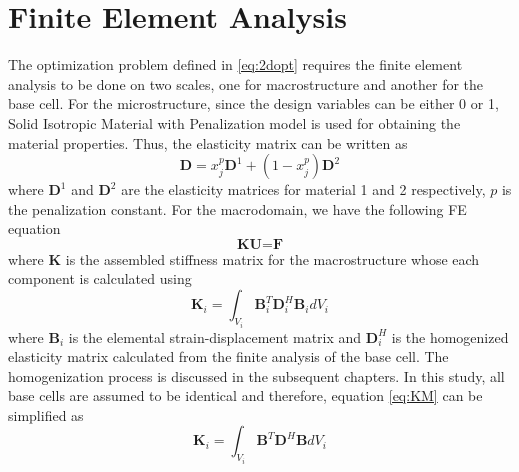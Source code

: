 \documentclass[openright,twoside]{iitkthesis}
\begin{document}
\section{Finite Element Analysis} 
The optimization problem defined in \eqref{eq:2dopt} requires the finite element analysis to be done on two scales, one for macrostructure and another for the base cell. For the microstructure, since the design variables can be either 0 or 1, Solid Isotropic Material with Penalization model\cite{paper:simp} is used for obtaining the material properties. Thus, the elasticity matrix can be written as
\begin{equation}
\label{eq:simp}
\textbf{D} = x_j^p\textbf{D}^1 + (1-x_j^p)\textbf{D}^2
\end{equation}
where $\textbf{D}^1$ and $\textbf{D}^2$ are the elasticity matrices for material 1 and 2 respectively, $p$ is the penalization constant.
For the macrodomain, we have the following FE equation
\begin{equation}
\textbf{KU} = \textbf{F}
\end{equation}
where $\textbf{K}$ is the assembled stiffness matrix for the macrostructure whose each component is calculated using
\begin{equation}
\label{eq:KM}
\textbf{K}_i =  \int_{V_i} \textbf{B}_i^T\textbf{D}_i^H\textbf{B}_i dV_i
\end{equation} 
where $\textbf{B}_i$ is the elemental strain-displacement matrix and $\textbf{D}_i^H$ is the homogenized elasticity matrix calculated from the finite analysis of the base cell. The homogenization process\cite{paper:homogenization} is discussed in the subsequent chapters. In this study, all base cells are assumed to be identical and therefore, equation \eqref{eq:KM} can be simplified as
\begin{equation}
\label{eq:KM1}
\textbf{K}_i =  \int_{V_i} \textbf{B}^T\textbf{D}^H\textbf{B} dV_i
\end{equation} 
\end{document}
